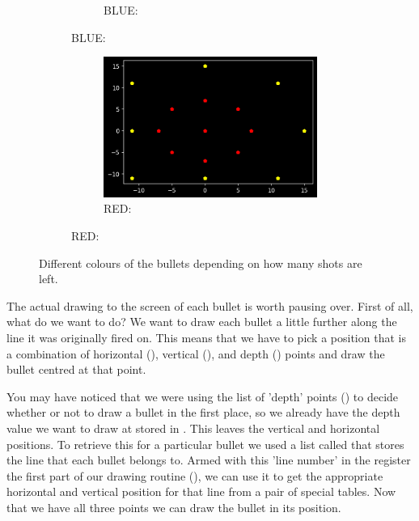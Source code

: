 \begin{figure}[H]
{\begin{adjustbox}{width=15cm,center}
\begin{subfigure}{0.3\textwidth}
\begin{figure}[H]
\begin{adjustbox}{width=4cm,center}
          \end{adjustbox}
          \caption{BLUE: }
        \end{figure}
      \end{subfigure}
      \begin{subfigure}{0.3\textwidth}
        \begin{figure}[H]
          \centering
          \begin{adjustbox}{width=4cm,center}
            \includegraphics[width=12cm]{src/bullets/red_graph.png}%
          \end{adjustbox}
          \caption{RED: }
        \end{figure}
      \end{subfigure}
    \end{adjustbox}
    }\caption[]{Different colours of the bullets depending on how many shots are left.}
\end{figure}

The actual drawing to the screen of each bullet is worth pausing over. First of all, what
do we want to do? We want to draw each bullet a little further along the line it was originally
fired on. This means that we have to pick a position that is a combination of horizontal (),
vertical (), and depth () points and draw the bullet centred at that point.

You may have noticed that we were using the list of 'depth' points () to decide whether or not
to draw a bullet in the first place, so we already have the depth value we want to draw at stored in
. This leaves the vertical and horizontal positions. To retrieve this for a particular bullet
we used a list called  that stores the line that each bullet belongs to. Armed with this
'line number' in the  register the first part of our drawing routine (), we can
use it to get the appropriate horizontal and vertical position for that line from a pair of special
tables. Now that we have all three points we can draw the bullet in its position. 


